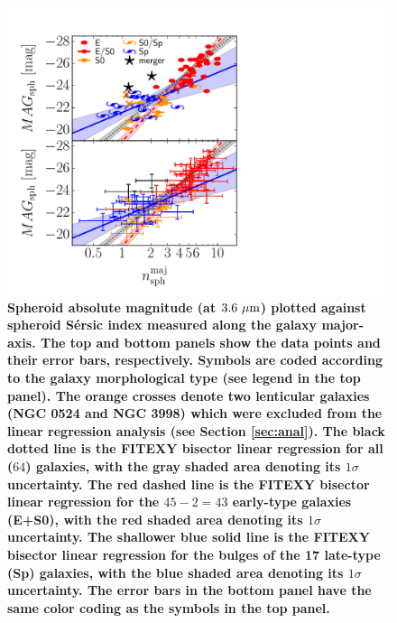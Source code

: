\documentclass[preprint2]{emulateapj}
\begin{document}
\begin{figure}[h]
\begin{center}
\includegraphics[width=\columnwidth, trim = 20 0 220 0]{images/mag_vs_n_maj.pdf}
\caption{\bf Spheroid absolute magnitude (at $3.6\rm~\mu m$) plotted against spheroid S\'ersic index 
measured along the galaxy major-axis. 
The top and bottom panels show the data points and their error bars, respectively.  
Symbols are coded according to the galaxy morphological type (see legend in the top panel).
The orange crosses denote two lenticular galaxies (NGC 0524 and NGC 3998) which were excluded from the linear regression analysis 
(see Section \ref{sec:anal}). 
The black dotted line is the FITEXY bisector linear regression for all ($64$) galaxies, 
with the gray shaded area denoting its $1\sigma$ uncertainty. 
The red dashed line is the FITEXY bisector linear regression for the $45-2=43$  early-type galaxies (E+S0), 
with the red shaded area denoting its $1\sigma$ uncertainty. 
The shallower blue solid line is the FITEXY bisector linear regression for the bulges of the 17 late-type (Sp) galaxies, 
with the blue shaded area denoting its $1\sigma$ uncertainty. 
The error bars in the bottom panel have the same color coding as the symbols in the top panel. 
}
\label{fig:magn}
\end{center}
\end{figure}
\end{document}
